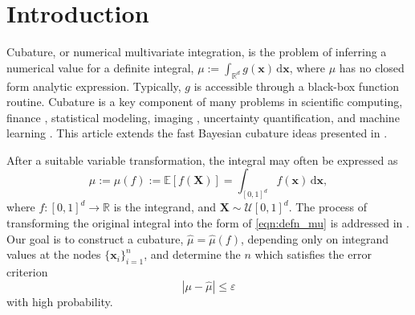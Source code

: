 \documentclass[graybox,footinfo]{svmult}
\newcommand{\bm}[1]{\boldsymbol{#1}}
\newcommand{\dif}[1]{\text{d}{#1}}
\newcommand{\reals}{\mathbb{R}}
\newcommand{\Ex}{\mathbb{E}}
\newcommand{\vx}{\bm{x}}
\newcommand{\dvx}{\dif{\bm{x}}}
\newcommand{\hmu}{\widehat{\mu}}
\newcommand{\errtol}{\varepsilon}
\def\abs#1{\ensuremath{\left \lvert #1 \right \rvert}}
\newcommand{\JRNote}[1]{{\textcolor{green}{JR: #1}}}
\begin{document}





\section{Introduction}
\label{intro}

Cubature, or numerical multivariate integration, is the problem of inferring a numerical value for a definite integral, 
$ \mu := \int_{\reals^d} g(\vx) \, \dif \vx$, where $\mu$ has no closed form analytic expression. Typically, $g$ is accessible through a black-box function routine. 
Cubature is a key component of many problems in scientific computing, finance \cite{Gla03}, statistical modeling, imaging \cite{Keller2013}, uncertainty quantification, and machine learning \cite{Goodfellow-et-al-2016}. This article extends the fast Bayesian cubature ideas presented in \cite{RatHic19a}.

After a suitable variable transformation, the integral may often be expressed as
\begin{equation}
\label{eqn:defn_mu}
\mu:= \mu(f) := \Ex[f(\boldsymbol{X})] = \int_{[0,1]^d} f(\vx)\, \dvx, 
\end{equation}
where $f:[0,1]^d \to \reals$ is the integrand, and $\boldsymbol{X} \sim \mathcal{U}[0,1]^d$.  The process of transforming the original integral into the form of \eqref{eqn:defn_mu} is addressed in \cite{BecHae92b, Sid08a, Sid93, Lau96a, CriEtal07}.  Our goal is to construct a cubature, $\hmu = \hmu(f)$, depending only on integrand values at the nodes $\{\vx_i\}_{i=1}^n$, and determine the $n$ which satisfies the error criterion
\begin{equation}
\label{eqn:err_crit} 
\abs{\mu - \hmu} \leq \errtol
\end{equation}
with high probability.
\end{document}
